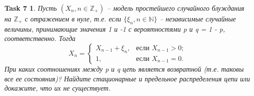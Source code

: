 \documentclass[12pt,a4paper]{extarticle}
\newtheorem*{task7}{Task 7}
\newcommand{\Z}{\mathbb{Z}}
\newcommand{\N}{\mathbb{N}}
\begin{document}
	\vspace{\baselineskip}
	\begin{task7}
		Пусть $(X_n , n \in \Z_+)$ -- модель простейшего случайного блуждания на $\Z_+$ с отражением в нуле, т.е. если $\{\xi_n , n\in \N\}$ -- независимые случайные величины, принимающие значения 1 и -1 с вероятностями p и q = 1 - p, соответственно.
		Тогда
		\[
			X_n =
			\begin{cases}
				X_{n-1} + \xi_n, & \text{если $X_{n-1} > 0$};
				\\
				1, & \text{если $X_{n-1} = 0$}.
			\end{cases}
		\]
		При каких соотношениях между p и q цепь является возвратной (т.е. таковы все ее состояния)? Найдите стационарные и предельное распределения цепи
		или докажите, что их не существует.
	\end{task7}
\end{document}
